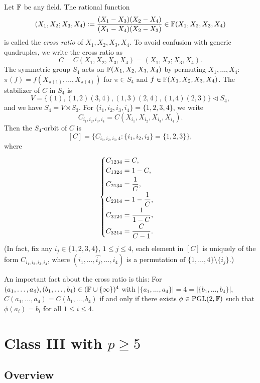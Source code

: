\documentclass{amsart}
\numberwithin{equation}{section}
\theoremstyle{definition}
\newcommand{\f}{\Bbb F}
\newcommand{\pgl}{\mathrm{PGL}}
\begin{document}
Let $\f$ be any field. The rational function
\[
(X_1,X_2;X_3,X_4):=\frac{(X_1-X_3)(X_2-X_4)}{(X_1-X_4)(X_2-X_3)}\in\f(X_1,X_2,X_3,X_4)
\]
is called the {\em cross ratio} of $X_1,X_2,X_3,X_4$. To avoid confusion with generic quadruples, we write the cross ratio as
\[
C=C(X_1,X_2,X_3,X_4)=(X_1,X_2;X_3,X_4).
\]
The symmetric group $S_4$ acts on $\f(X_1,X_2,X_3,X_4)$ by permuting $X_1,\dots,X_4$: $\pi(f)=f(X_{\pi(1)},\dots,X_{\pi(4)})$ for $\pi\in S_4$ and $f\in\f(X_1,X_2,X_3,X_4)$. The stabilizer of $C$ in $S_4$ is
\[
V=\{(1),(1,2)(3,4),(1,3)(2,4),(1,4)(2,3)\}\vartriangleleft S_4,
\]
and we have $S_4=V\rtimes S_3$. For $\{i_1,i_2,i_3,i_4\}=\{1,2,3,4\}$, we write
\[
C_{i_1,i_2,i_3,i_4}=C(X_{i_1},X_{i_2},X_{i_3},X_{i_4}).
\]
Then the $S_4$-orbit of $C$ is 
\[
[C]=\bigl\{C_{i_1,i_2,i_3,4}:\{i_1,i_2,i_3\}=\{1,2,3\}\bigr\},
\]
where
\begin{equation}\label{C1234}
\begin{cases}
C_{1234}=C,\cr
C_{1324}=1-C,\vspace{0.2em}\cr
C_{2134}=\displaystyle \frac 1C,\vspace{0.2em}\cr
C_{2314}=\displaystyle 1-\frac 1C,\vspace{0.2em}\cr
C_{3124}=\displaystyle \frac 1{1-C},\vspace{0.2em}\cr
C_{3214}=\displaystyle \frac C{C-1}.
\end{cases}
\end{equation}
(In fact, fix any $i_j\in\{1,2,3,4\}$, $1\le j\le 4$, each element in $[C]$ is uniquely of the form $C_{i_1,i_2,i_3,i_4}$, where $(i_1,\dots,\widehat{i_j},\dots,i_4)$ is a permutation of $\{1,\dots,4\}\setminus\{i_j\}$.)

An important fact about the cross ratio is this: For $(a_1,\dots,a_4),(b_1,\dots,b_4)\in(\f\cup\{\infty\})^4$ with $|\{a_1,\dots,a_4\}|=4=|\{b_1,\dots,b_4\}|$, $C(a_1,\dots,a_4)=C(b_1,\dots,b_4)$ if and only if there exists $\phi\in\pgl(2,\f)$ such that $\phi(a_i)=b_i$ for all $1\le i\le 4$.


\section{Class III with $p\ge 5$}\label{sec6}

\subsection{Overview}\
\end{document}
